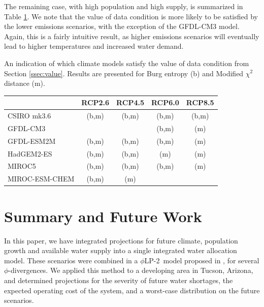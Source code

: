 \documentclass[opre,nonblindrev]{informs3} %
\newcommand{\plp}{$\phi$LP-2}
\begin{document}
The remaining case, with high population and high supply, is summarized in Table \ref{tb:value}.
We note that the value of data condition is more likely to be satisfied by the lower emissions scenarios, with the exception of the GFDL-CM3 model.
Again, this is a fairly intuitive result, as higher emissions scenarios will eventually lead to higher temperatures and increased water demand.

\begin{table}
	\TABLE
	{
		An indication of which climate models satisfy the value of data condition from Section \ref{ssec:value}.
		Results are presented for Burg entropy (b) and Modified $\chi^2$ distance (m).
		\label{tb:value}
	}
	{\begin{tabular}{l|cccc}
		               & RCP2.6    & RCP4.5    & RCP6.0    & RCP8.5 \\
		\hline
		CSIRO mk3.6    & (b,m)     & (b,m)     & (b,m)     & (b,m)     \\
		GFDL-CM3       &           &           & (b,m)     & (m)       \\
		GFDL-ESM2M     & (b,m)     & (b,m)     & (b,m)     & (m)       \\
		HadGEM2-ES     & (b,m)     & (b,m)     & (m)       & (m)       \\
		MIROC5         & (b,m)     & (b,m)     & (b,m)     & (m)       \\
		MIROC-ESM-CHEM & (b,m)     & (m)       &           &           \\
	 \end{tabular}}
	{}
\end{table}

\section{Summary and Future Work}
\label{sec:concl}

In this paper, we have integrated projections for future climate, population growth and available water supply into a single integrated water allocation model.
These scenarios were combined in a \plp\ model proposed in \cite{love2013phi}, for several $\phi$-divergences.
We applied this method to a developing area in Tucson, Arizona, and determined projections for the severity of future water shortages, the expected operating cost of the system, and a worst-case distribution on the future scenarios.
\end{document}
